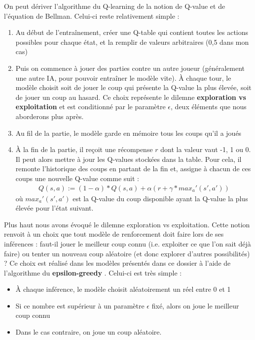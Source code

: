 \documentclass[french]{article}
\begin{document}
    On peut dériver l'algorithme du Q-learning de la notion de Q-value et de l'équation de Bellman. Celui-ci reste relativement simple :
    \begin{enumerate}
        \item Au début de l'entraînement, créer une Q-table qui contient toutes les actions possibles pour chaque état, et la remplir de valeurs arbitraires (0,5 dans mon cas)
        \item Puis on commence à jouer des parties contre un autre joueur (généralement une autre IA, pour pouvoir entraîner le modèle vite). À chaque tour, le modèle choisit soit de jouer le coup qui présente la Q-value la plus élevée, soit de jouer un coup au hasard. Ce choix représente le dilemne \textbf{exploration vs exploitation} et est conditionné par le paramètre $\epsilon$, deux éléments que nous aborderons plus après. 
        \item Au fil de la partie, le modèle garde en mémoire tous les coups qu'il a joués
        \item À la fin de la partie, il reçoit une récompense $r$ dont la valeur vaut -1, 1 ou 0. Il peut alors mettre à jour les Q-values stockées dans la table. Pour cela, il remonte l'historique des coups en partant de la fin et, assigne à chacun de ces coups une nouvelle Q-value comme suit :
        \begin{align*} 
            Q(s,a) := (1-\alpha)*Q(s,a) + \alpha(r + \gamma * max_a'(s',a'))
        \end{align*}
        où $max_a'(s',a')$ est la Q-value du coup disponible ayant la Q-value la plus élevée pour l'état suivant.
        
    \end{enumerate}

    Plus haut nous avons évoqué le dilemne exploration vs exploitation. Cette notion renvoit à un choix que tout modèle de renforcement doit faire lors de ses inférences : faut-il jouer le meilleur coup connu (i.e. exploiter ce que l'on sait déjà faire) ou tenter un nouveau coup aléatoire (et donc explorer d'autres possibilités) ? Ce choix est réalisé dans les modèles présentés dans ce dossier à l'aide de l'algorithme du \textbf{epsilon-greedy} \cite{epsilon-greedy}. Celui-ci est très simple :
    \begin{itemize}
        \item À chaque inférence, le modèle choisit aléatoirement un réel entre 0 et 1
        \item Si ce nombre est supérieur à un paramètre $\epsilon$ fixé, alors on joue le meilleur coup connu
        \item Dans le cas contraire, on joue un coup aléatoire.
    \end{itemize}
\end{document}
